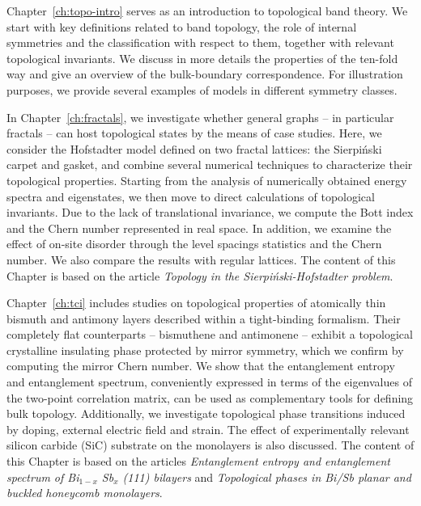 \vspace{0.22cm}
\noindent Chapter~\ref{ch:topo-intro} serves as an introduction to topological band theory. We start with key definitions related to band topology, the role of internal symmetries and the classification with respect to them, together with relevant topological invariants. We discuss in more details the properties of the ten-fold way and give an overview of the bulk-boundary correspondence. For illustration purposes, we provide several examples of models in different symmetry classes.

\vspace{0.22cm}
\noindent In Chapter~\ref{ch:fractals}, we investigate whether general graphs --  in particular fractals -- can host topological states by the means of case studies. Here, we consider the Hofstadter model defined on two fractal lattices: the Sierpiński carpet and gasket, and combine several numerical techniques to characterize their topological properties. Starting from the analysis of numerically obtained energy spectra and eigenstates, we then move to direct calculations of topological invariants. Due to the lack of translational invariance, we compute the Bott index and the Chern number represented in real space. In addition, we examine the effect of on-site disorder through the level spacings statistics and the Chern number. We also compare the results with regular lattices. The content of this Chapter is based on the article \emph{Topology in the Sierpiński-Hofstadter problem}.
 
\vspace{0.22cm}
\noindent Chapter~\ref{ch:tci} includes studies on topological properties of atomically thin bismuth and antimony layers described within a tight-binding formalism. Their completely flat counterparts -- bismuthene and antimonene -- exhibit a topological crystalline insulating phase protected by mirror symmetry, which we confirm by computing the mirror Chern number. We show that the entanglement entropy and entanglement spectrum, conveniently expressed in terms of the eigenvalues of the two-point correlation matrix, can be used as complementary tools for defining bulk topology. Additionally, we investigate topological phase transitions induced by doping, external electric field and strain. The effect of experimentally relevant silicon carbide (SiC) substrate on the monolayers is also discussed. The content of this Chapter is based on the articles \emph{Entanglement entropy and entanglement spectrum of Bi$_{1-x}$ Sb$_{x}$ (111) bilayers} and \emph{Topological phases in Bi/Sb planar and buckled honeycomb monolayers}.

